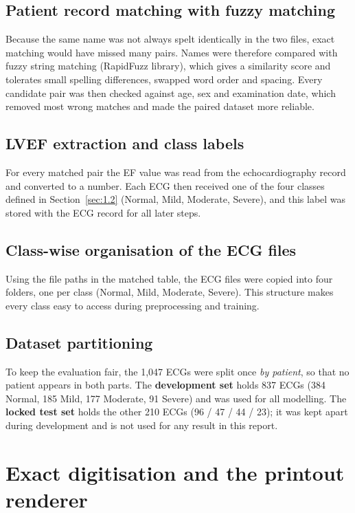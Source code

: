 \subsection{Patient record matching with fuzzy matching}\label{sec:3.2.3}

Because the same name was not always spelt identically in the two files, exact matching would have missed many pairs. Names were therefore compared with fuzzy string matching (RapidFuzz library), which gives a similarity score and tolerates small spelling differences, swapped word order and spacing. Every candidate pair was then checked against age, sex and examination date, which removed most wrong matches and made the paired dataset more reliable.

\subsection{LVEF extraction and class labels}\label{sec:3.2.4}

For every matched pair the EF value was read from the echocardiography record and converted to a number. Each ECG then received one of the four classes defined in Section~\ref{sec:1.2} (Normal, Mild, Moderate, Severe), and this label was stored with the ECG record for all later steps.

\subsection{Class-wise organisation of the ECG files}\label{sec:3.2.5}

Using the file paths in the matched table, the ECG files were copied into four folders, one per class (Normal, Mild, Moderate, Severe). This structure makes every class easy to access during preprocessing and training.

\subsection{Dataset partitioning}\label{sec:3.2.6}

To keep the evaluation fair, the 1,047 ECGs were split once \emph{by patient}, so that no patient appears in both parts. The \textbf{development set} holds 837 ECGs (384 Normal, 185 Mild, 177 Moderate, 91 Severe) and was used for all modelling. The \textbf{locked test set} holds the other 210 ECGs (96 / 47 / 44 / 23); it was kept apart during development and is not used for any result in this report.

\section{Exact digitisation and the printout renderer}\label{sec:3.3}

